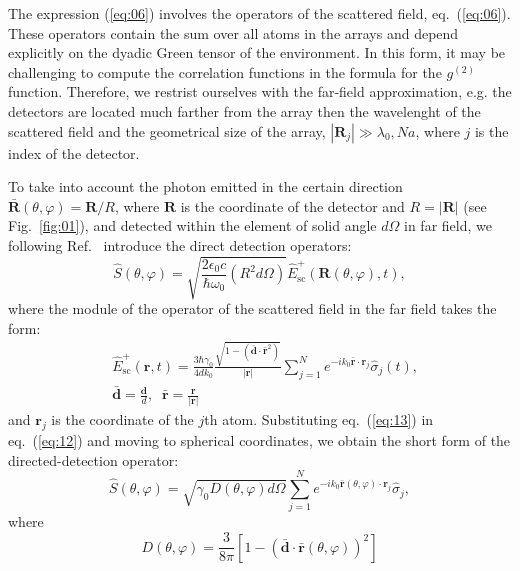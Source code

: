 \documentclass[aps,prl,twocolumn,superscriptaddress,showpacs,amsmath,amssymb]{revtex4-2}
\begin{document}
The expression (\ref{eq:06}) involves the operators of the scattered field, eq.~(\ref{eq:06}). 
These operators contain the sum over all atoms in the arrays and depend explicitly on the dyadic Green tensor of the environment.
In this form, it may be challenging to compute the correlation functions in the formula for the $g^{(2)}$ function.
Therefore, we restrist ourselves with the far-field approximation, e.g. the detectors are located much farther from the array then the wavelenght of the scattered field and the geometrical size of the array, $|\mathbf{R}_j| \gg \lambda_0, N a$, where $j$ is the index of the detector.

To take into account the photon emitted in the certain direction $\bar{\mathbf{R}}(\theta, \varphi) = \mathbf{R} / R$, where $\mathbf{R}$ is the coordinate of the detector and $R = |\mathbf{R}|$ (see Fig.~\ref{fig:01}), and detected within the element of solid angle $d \Omega$ in far field, we following
Ref.~\cite{carmichael2000quantum} introduce the direct detection operators:
\begin{equation}
    \hat{S}(\theta, \varphi) = \sqrt{\frac{2 \epsilon_0 c}{\hbar \omega_0} \left( R^2 d \Omega \right)} \hat{E}_\mathrm{sc}^+ (\mathbf{R}(\theta, \varphi), t),
    \label{eq:12}
\end{equation}
where the module of the operator of the scattered field in the far field takes the form:
\begin{align}
    \label{eq:13}
    &\hat{E}_\mathrm{sc}^+ (\mathbf{r}, t) = \frac{3 \hbar \gamma_0}{4 d k_0} \frac{\sqrt{1 - \left( \bar{\mathbf{d}} \cdot \bar{\mathbf{r}}^2 \right)}}{|\mathbf{r}|} \sum_{j=1}^N e^{-i k_0 \bar{\mathbf{r}} \cdot \mathbf{r}_j} \hat{\sigma}_j(t), \\
    & \bar{\mathbf{d}} = \frac{\mathbf{d}}{d}, \;\; \bar{\mathbf{r}} = \frac{\mathbf{r}}{|\mathbf{r}|} \nonumber
\end{align}
and $\mathbf{r}_j$ is the coordinate of the $j$th atom.
Substituting eq.~(\ref{eq:13}) in eq.~(\ref{eq:12}) and moving to spherical coordinates, we obtain the short form of the directed-detection operator:
\begin{equation}
    \hat{S}(\theta, \varphi) = \sqrt{\gamma_0 D(\theta, \varphi) d \Omega} \sum_{j=1}^N e^{-i k_0 \bar{\mathbf{r}}(\theta, \varphi) \cdot \mathbf{r}_j} \hat{\sigma}_j,
    \label{eq:14}
\end{equation}
where 
\begin{equation}
    D(\theta, \varphi) = \frac{3}{8 \pi} \left[ 1 - \left( \bar{\mathbf{d}} \cdot \bar{\mathbf{r}}(\theta, \varphi) \right)^2 \right]
    \label{eq:15}
\end{equation}
\end{document}

